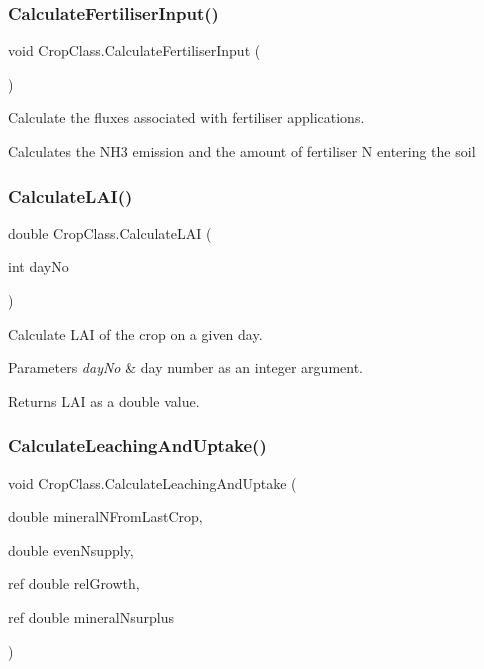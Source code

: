 \subsubsection{\texorpdfstring{CalculateFertiliserInput()}{CalculateFertiliserInput()}}
{\footnotesize\ttfamily void Crop\+Class.\+Calculate\+Fertiliser\+Input (\begin{DoxyParamCaption}{ }\end{DoxyParamCaption})\hspace{0.3cm}{\ttfamily [inline]}}



Calculate the fluxes associated with fertiliser applications. 

Calculates the N\+H3 emission and the amount of fertiliser N entering the soil \mbox{\label{class_crop_class_a326d0d9193c44baa7e949bdcec4c352d}} 
\subsubsection{\texorpdfstring{CalculateLAI()}{CalculateLAI()}}
{\footnotesize\ttfamily double Crop\+Class.\+Calculate\+L\+AI (\begin{DoxyParamCaption}\item[{int}]{day\+No }\end{DoxyParamCaption})\hspace{0.3cm}{\ttfamily [inline]}}



Calculate L\+AI of the crop on a given day. 


\begin{DoxyParams}{Parameters}
{\em day\+No} & day number as an integer argument. \\
\hline
\end{DoxyParams}
\begin{DoxyReturn}{Returns}
L\+AI as a double value. 
\end{DoxyReturn}
\mbox{\label{class_crop_class_ae0e4325ab32156542dbdc53a9ccb427b}} 
\subsubsection{\texorpdfstring{CalculateLeachingAndUptake()}{CalculateLeachingAndUptake()}}
{\footnotesize\ttfamily void Crop\+Class.\+Calculate\+Leaching\+And\+Uptake (\begin{DoxyParamCaption}\item[{double}]{mineral\+N\+From\+Last\+Crop,  }\item[{double}]{even\+Nsupply,  }\item[{ref double}]{rel\+Growth,  }\item[{ref double}]{mineral\+Nsurplus }\end{DoxyParamCaption})\hspace{0.3cm}{\ttfamily [inline]}}



